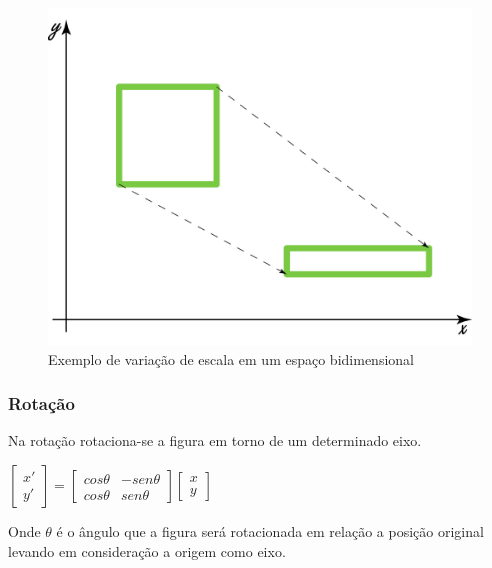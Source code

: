 \documentclass[9pt, a4paper, nofonttune, journal]{IEEEtran}
\begin{document}
\begin{figure}[H]
\begin{center}
\includegraphics[scale=0.25]{figuras/scale1.png}
\caption{Exemplo de variação de escala em um espaço bidimensional}
\end{center}
\end{figure}


\subsubsection{Rotação}
Na rotação rotaciona-se a figura em torno de um determinado eixo.

\begin{center}
$\begin{bmatrix}x'\\
y'
\end{bmatrix}=\begin{bmatrix}cos\theta & -sen\theta\\
cos\theta & sen\theta
\end{bmatrix}\begin{bmatrix}x\\
y
\end{bmatrix}$\end{center}
Onde $\theta$ é o ângulo que a figura será rotacionada em relação a posição original levando em consideração a origem como eixo. \cite{CGPPBook1}
\end{document}
